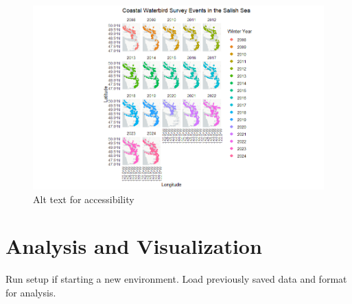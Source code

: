 \documentclass[
  letterpaper,
  DIV=11,
  numbers=noendperiod]{scrreprt}
\begin{document}
\begin{figure}[H]

{\centering \includegraphics{Images/EventsMapbyYear.png}

}

\caption{Alt text for accessibility}

\end{figure}%


\chapter{Analysis and Visualization}\label{analysis-and-visualization}

Run setup if starting a new environment. Load previously saved data and
format for analysis.
\end{document}
